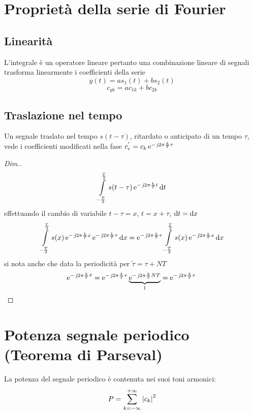 \section{Proprietà della serie di Fourier}
\subsection{Linearità}L'integrale è un operatore lineare pertanto una combinazione lineare di segnali trasforma linearmente i coefficienti della serie
\[ y(t)=a s_1(t)+ b s_2(t)\]
\[ c_{y k}= a c_{1 k} + b c_{2 k} \]

\subsection{Traslazione nel tempo}
Un segnale traslato nel tempo $s(t-\tau)$, ritardato o anticipato di un tempo $\tau$, vede i coefficienti modificati nella fase $c_r^{'}=c_k \operatorname{e}^{-\operatorname{\mathit{j}\!} 2\pi\frac{k}{T}\tau}$

\begin{proof}[Dim.]
\[ \int\limits_{-\frac{T}{2}}^{\frac{T}{2}}{s(t-\tau)\operatorname{e}^{-\operatorname{\mathit{j}\!} 2\pi\frac{k}{T}t}}{\,\mathop{}\!\mathrm{d}{t}} \]
effettuando il cambio di variabile $t-\tau=x$, $t=x+\tau$, $\mathop{}\!\mathrm{d} t=\mathop{}\!\mathrm{d} x$
\[\int\limits_{-\frac{T}{2}}^{\frac{T}{2}}{s(x)\operatorname{e}^{-\operatorname{\mathit{j}\!} 2\pi\frac{k}{T}x}\operatorname{e}^{-\operatorname{\mathit{j}\!} 2\pi\frac{k}{T}\tau}}{\,\mathop{}\!\mathrm{d}{x}} =
\operatorname{e}^{-\operatorname{\mathit{j}\!} 2\pi\frac{k}{T}\tau} \int\limits_{-\frac{T}{2}}^{\frac{T}{2}}{s(x)\operatorname{e}^{-\operatorname{\mathit{j}\!} 2\pi\frac{k}{T}x}}{\,\mathop{}\!\mathrm{d}{x}}\]
si nota anche che data la periodicità per $\tilde{\tau}=\tau+N T$
\[\operatorname{e}^{-\operatorname{\mathit{j}\!} 2\pi\frac{k}{T}\tilde{\tau}}=
\operatorname{e}^{-\operatorname{\mathit{j}\!} 2\pi\frac{k}{T}\tau} \underbrace{\operatorname{e}^{-\operatorname{\mathit{j}\!} 2\pi\frac{k}{T}N T}}_{1}=\operatorname{e}^{-\operatorname{\mathit{j}\!} 2\pi\frac{k}{T}\tau}
\qedhere\]
\end{proof}

\section{Potenza segnale periodico (Teorema di Parseval)}
La potenza del segnale periodico è contenuta nei suoi toni armonici:
\begin{equation}\label{eq:teo_Parseval}\index{Teorema!Parseval}
P=\sum_{k=-\infty}^{+\infty}{\abs{c_k}^2}
\end{equation}

